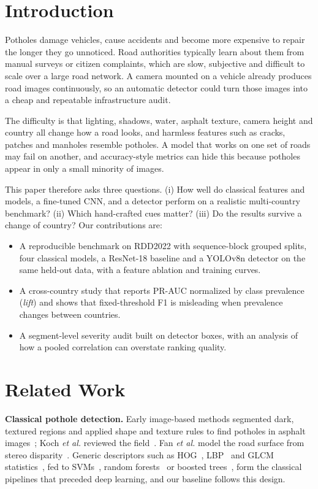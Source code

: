 \documentclass[conference]{IEEEtran}
\begin{document}
\section{Introduction}
Potholes damage vehicles, cause accidents and become more expensive to repair the longer they go unnoticed. Road authorities typically learn about them from manual surveys or citizen complaints, which are slow, subjective and difficult to scale over a large road network. A camera mounted on a vehicle already produces road images continuously, so an automatic detector could turn those images into a cheap and repeatable infrastructure audit.

The difficulty is that lighting, shadows, water, asphalt texture, camera height and country all change how a road looks, and harmless features such as cracks, patches and manholes resemble potholes. A model that works on one set of roads may fail on another, and accuracy-style metrics can hide this because potholes appear in only a small minority of images.

This paper therefore asks three questions. (i) How well do classical features and models, a fine-tuned CNN, and a detector perform on a realistic multi-country benchmark? (ii) Which hand-crafted cues matter? (iii) Do the results survive a change of country? Our contributions are:
\begin{itemize}
\item A reproducible benchmark on RDD2022 with sequence-block grouped splits, four classical models, a ResNet-18 baseline and a YOLOv8n detector on the same held-out data, with a feature ablation and training curves.
\item A cross-country study that reports PR-AUC normalized by class prevalence (\emph{lift}) and shows that fixed-threshold F1 is misleading when prevalence changes between countries.
\item A segment-level severity audit built on detector boxes, with an analysis of how a pooled correlation can overstate ranking quality.
\end{itemize}

\section{Related Work}
\textbf{Classical pothole detection.} Early image-based methods segmented dark, textured regions and applied shape and texture rules to find potholes in asphalt images~\cite{koch2011pothole}; Koch \textit{et al.} reviewed the field~\cite{koch2015review}. Fan \textit{et al.} model the road surface from stereo disparity~\cite{fan2020pothole}. Generic descriptors such as HOG~\cite{dalal2005hog}, LBP~\cite{ojala2002lbp} and GLCM statistics~\cite{haralick1973glcm}, fed to SVMs~\cite{cortes1995svm}, random forests~\cite{breiman2001random} or boosted trees~\cite{chen2016xgboost}, form the classical pipelines that preceded deep learning, and our baseline follows this design.
\end{document}
